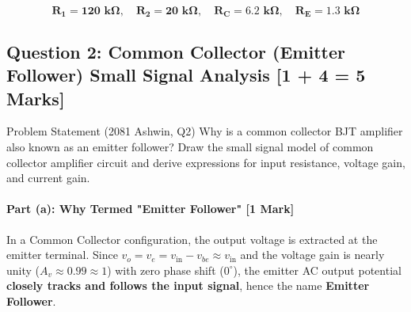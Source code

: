 \documentclass[11pt,a4paper,oneside]{book}
\begin{document}
\begin{answerbox}
$$\mathbf{R_1 = 120\text{ k}\Omega, \quad R_2 = 20\text{ k}\Omega, \quad R_C = 6.2\text{ k}\Omega, \quad R_E = 1.3\text{ k}\Omega}$$
\end{answerbox}

\vspace{0.6cm}

\subsection{Question 2: Common Collector (Emitter Follower) Small Signal Analysis [1 + 4 = 5 Marks]}
\begin{questionbox}{Problem Statement (2081 Ashwin, Q2)}
Why is a common collector BJT amplifier also known as an emitter follower? Draw the small signal model of common collector amplifier circuit and derive expressions for input resistance, voltage gain, and current gain.
\end{questionbox}

\paragraph{Part (a): Why Termed "Emitter Follower" [1 Mark]}
In a Common Collector configuration, the output voltage is extracted at the emitter terminal. Since $v_o = v_e = v_{\text{in}} - v_{be} \approx v_{\text{in}}$ and the voltage gain is nearly unity ($A_v \approx 0.99 \approx 1$) with zero phase shift ($0^\circ$), the emitter AC output potential \textbf{closely tracks and follows the input signal}, hence the name \textbf{Emitter Follower}.
\end{document}
